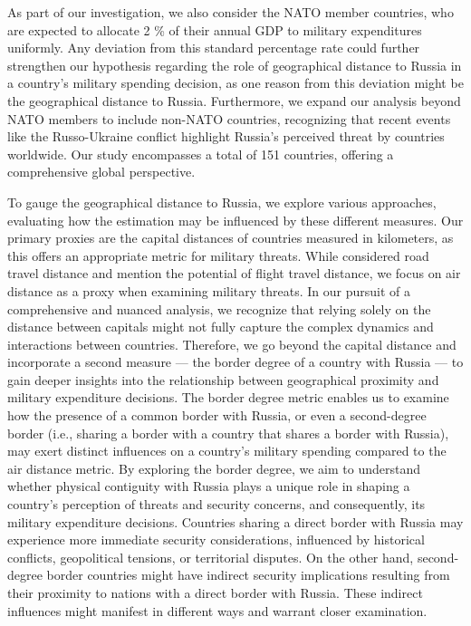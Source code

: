 \documentclass[12pt,a4paper]{article}
\begin{document}
As part of our investigation, we also consider the NATO member countries, who are expected to allocate 2 \% of their annual GDP to military expenditures uniformly. Any deviation from this standard percentage rate could further strengthen our hypothesis regarding the role of geographical distance to Russia in a country's military spending decision, as one reason from this deviation might be the geographical distance to Russia. Furthermore, we expand our analysis beyond NATO members to include non-NATO countries, recognizing that recent events like the Russo-Ukraine conflict highlight Russia's perceived threat by countries worldwide. Our study encompasses a total of 151 countries, offering a comprehensive global perspective. 

To gauge the geographical distance to Russia, we explore various approaches, evaluating how the estimation may be influenced by these different measures. Our primary proxies are the capital distances of countries measured in kilometers, as this offers an appropriate metric for military threats. While \citet{kofrovn2023} considered road travel distance and mention the potential of flight travel distance, we focus on air distance as a proxy when examining military threats. 
In our pursuit of a comprehensive and nuanced analysis, we recognize that relying solely on the distance between capitals might not fully capture the complex dynamics and interactions between countries. Therefore, we go beyond the capital distance and incorporate a second measure — the border degree of a country with Russia — to gain deeper insights into the relationship between geographical proximity and military expenditure decisions. The border degree metric enables us to examine how the presence of a common border with Russia, or even a second-degree border (i.e., sharing a border with a country that shares a border with Russia), may exert distinct influences on a country's military spending compared to the air distance metric. By exploring the border degree, we aim to understand whether physical contiguity with Russia plays a unique role in shaping a country's perception of threats and security concerns, and consequently, its military expenditure decisions. Countries sharing a direct border with Russia may experience more immediate security considerations, influenced by historical conflicts, geopolitical tensions, or territorial disputes. On the other hand, second-degree border countries might have indirect security implications resulting from their proximity to nations with a direct border with Russia. These indirect influences might manifest in different ways and warrant closer examination.
\end{document}
